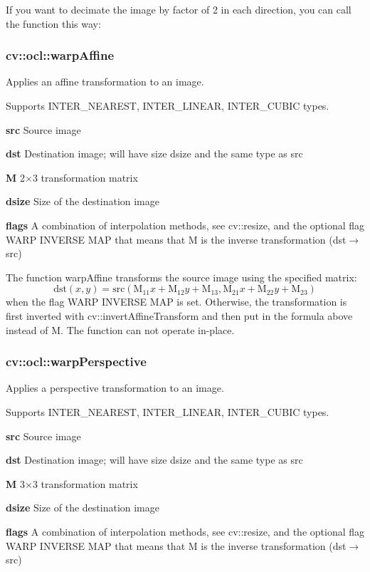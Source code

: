 \documentclass{article}
\begin{document}
If you want to decimate the image by factor of 2 in each direction, you can
call the function this way:

\newpage

\subsubsection{cv::ocl::warpAffine }
\label{subsubsec:mylabel46}
Applies an affine transformation to an image.

Supports INTER{\_}NEAREST, INTER{\_}LINEAR, INTER{\_}CUBIC types.

\textbf{src }Source image

\textbf{dst }Destination image; will have size dsize and the same type as
src

\textbf{M }2$\times $3 transformation matrix

\textbf{dsize }Size of the destination image

\textbf{flags }A combination of interpolation methods, see cv::resize, and
the optional flag WARP INVERSE MAP that means that M is the inverse
transformation (dst$\to $src)

The function warpAffine transforms the source image using the specified
matrix:
\[
\mbox{dst}(x,y)=\mbox{src}(\mbox{M}_{11} x+\mbox{M}_{12} y+\mbox{M}_{13}
,\mbox{M}_{21} x+\mbox{M}_{22} y+\mbox{M}_{23} )
\]
when the flag WARP INVERSE MAP is set. Otherwise, the transformation is
first inverted with cv::invertAffineTransform and then put in the formula
above instead of M. The function can not operate in-place.

\newpage

\subsubsection{cv::ocl::warpPerspective }
\label{subsubsec:mylabel47}
Applies a perspective transformation to an image.

Supports INTER{\_}NEAREST, INTER{\_}LINEAR, INTER{\_}CUBIC types.

\textbf{src }Source image

\textbf{dst }Destination image; will have size dsize and the same type as
src

\textbf{M }3$\times $3 transformation matrix

\textbf{dsize }Size of the destination image

\textbf{flags }A combination of interpolation methods, see cv::resize, and
the optional flag WARP INVERSE MAP that means that M is the inverse
transformation (dst$\to $src)
\end{document}
